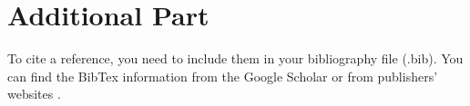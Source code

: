 \newpage
\section{Additional Part}
To cite a reference, you need to include them in your bibliography file (.bib). You can find the BibTex information from the Google Scholar or from publishers' websites \cite{franklin2015feedback}.